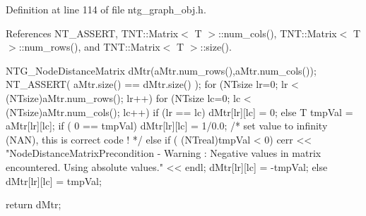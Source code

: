 Definition at line 114 of file ntg\_\-graph\_\-obj.h.



References NT\_\-ASSERT, TNT::Matrix$<$ T $>$::num\_\-cols(), TNT::Matrix$<$ T $>$::num\_\-rows(), and TNT::Matrix$<$ T $>$::size().




\begin{DoxyCode}
{
    NTG_NodeDistanceMatrix dMtr(aMtr.num_rows(),aMtr.num_cols());   
    NT_ASSERT( aMtr.size() == dMtr.size() );
    for (NTsize lr=0; lr < (NTsize)aMtr.num_rows(); lr++){
        for (NTsize lc=0; lc < (NTsize)aMtr.num_cols(); lc++) {
            if (lr == lc) dMtr[lr][lc] = 0;
            else {
                T tmpVal = aMtr[lr][lc]; 
                if ( 0 ==  tmpVal) dMtr[lr][lc] = 1/0.0; /* set value to infinity
       (NAN), this is correct code ! */ 
                else
                if ( (NTreal)tmpVal < 0) {
                    cerr << "NodeDistanceMatrixPrecondition - Warning : Negative 
      values in matrix encountered. Using absolute values." << endl; 
                    dMtr[lr][lc] = -tmpVal;
                } else dMtr[lr][lc] = tmpVal;
            }
        }   
    }
    
    return dMtr;
}
\end{DoxyCode}



